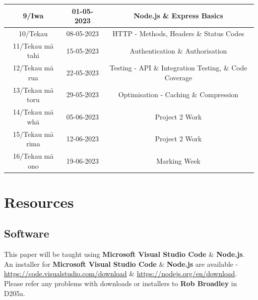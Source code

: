 \documentclass{article}
\begin{document}
\begin{tabular}{|c|c|c|c|}
	\footnotesize 9/Iwa            & \footnotesize 01-05-2023 & \multicolumn{2}{c|}{\footnotesize Node.js \& Express Basics}                                                                 \\ \hline
	\footnotesize 10/Tekau         & \footnotesize 08-05-2023 & \multicolumn{2}{c|}{\footnotesize HTTP - Methods, Headers \& Status Codes}                                                                 \\ \hline
	\footnotesize 11/Tekau mā tahi & \footnotesize 15-05-2023 & \multicolumn{2}{c|}{\footnotesize Authentication \& Authorisation}                                                                 \\ \hline
	\footnotesize 12/Tekau mā rua  & \footnotesize 22-05-2023 & \multicolumn{2}{c|}{\footnotesize Testing - API \& Integration Testing, \& Code Coverage}                                                                 \\ \hline
	\footnotesize 13/Tekau mā toru & \footnotesize 29-05-2023 & \multicolumn{2}{c|}{\footnotesize Optimisation - Caching \& Compression}                                                     \\ \hline
	\footnotesize 14/Tekau mā whā  & \footnotesize 05-06-2023 & \multicolumn{2}{c|}{\footnotesize Project 2 Work} \\ \hline 
	\footnotesize 15/Tekau mā rima & \footnotesize 12-06-2023 & \multicolumn{2}{c|}{\footnotesize Project 2 Work}                                                       \\ \hline
	\footnotesize 16/Tekau mā ono  & \footnotesize 19-06-2023 & \multicolumn{2}{c|}{\footnotesize Marking Week}                                                         \\ \hline
\end{tabular}


\section*{Resources}

\subsection*{Software}
This paper will be taught using \textbf{Microsoft Visual Studio Code} \& \textbf{Node.js}. An installer for \textbf{Microsoft Visual Studio Code} \& \textbf{Node.js} are available - \href{https://code.visualstudio.com/download}{https://code.visualstudio.com/download} \& \href{https://nodejs.org/en/download}{https://nodejs.org/en/download}. Please refer any problems with downloads or installers to \textbf{Rob Broadley} in D205a.
\end{document}
